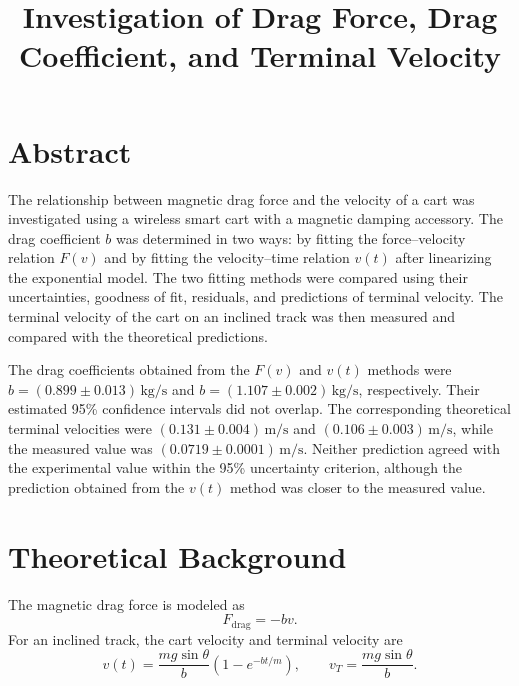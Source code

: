 \documentclass[11pt,a4paper]{article}
\title{Investigation of Drag Force, Drag Coefficient, and Terminal Velocity}
\begin{document}
\maketitle


\section{Abstract}

The relationship between magnetic drag force and the velocity of a cart was investigated using a wireless smart cart with a magnetic damping accessory. The drag coefficient $b$ was determined in two ways: by fitting the force--velocity relation $F(v)$ and by fitting the velocity--time relation $v(t)$ after linearizing the exponential model. The two fitting methods were compared using their uncertainties, goodness of fit, residuals, and predictions of terminal velocity. The terminal velocity of the cart on an inclined track was then measured and compared with the theoretical predictions.

The drag coefficients obtained from the $F(v)$ and $v(t)$ methods were $b=(0.899\pm0.013)\,\mathrm{kg/s}$ and $b=(1.107\pm0.002)\,\mathrm{kg/s}$, respectively. Their estimated 95\% confidence intervals did not overlap. The corresponding theoretical terminal velocities were $(0.131\pm0.004)\,\mathrm{m/s}$ and $(0.106\pm0.003)\,\mathrm{m/s}$, while the measured value was $(0.0719\pm0.0001)\,\mathrm{m/s}$. Neither prediction agreed with the experimental value within the 95\% uncertainty criterion, although the prediction obtained from the $v(t)$ method was closer to the measured value.


\section{Theoretical Background}

The magnetic drag force is modeled as
\[
F_{\mathrm{drag}}=-bv.
\]
For an inclined track, the cart velocity and terminal velocity are
\begin{equation}
v(t)=\frac{mg\sin\theta}{b}
\left(1-e^{-bt/m}\right),
\qquad
v_T=\frac{mg\sin\theta}{b}.
\label{eq:inclined}
\end{equation}
\end{document}
